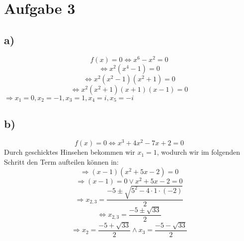 \section{Aufgabe 3}
    \subsection{a)}
        $$f(x) = 0 \Leftrightarrow x^6-x^2 = 0$$
        $$\Leftrightarrow x^2(x^4-1) = 0$$
        $$\Leftrightarrow x^2(x^2-1)(x^2+1) = 0$$
        $$\Leftrightarrow x^2(x^2+1)(x+1)(x-1) = 0$$
        $\Rightarrow x_1 = 0, x_2 = -1, x_3 = 1, x_4 = i, x_5 = -i$

    \subsection{b)}
        $$f(x) = 0 \Leftrightarrow x^3+4x^2-7x+2 = 0$$
        Durch geschicktes Hinsehen bekommen wir $x_1 = 1$, wodurch wir im folgenden Schritt den Term aufteilen können in:
        $$\Rightarrow (x-1)(x^2+5x-2) = 0$$
        $$\Rightarrow (x-1) = 0 \lor x^2+5x-2 = 0$$
        $$\Rightarrow x_{2,3} = \frac{-5 \pm \sqrt{5^2-4\cdot 1 \cdot (-2)}}{2}$$
        $$\Leftrightarrow x_{2,3} = \frac{-5 \pm \sqrt{33}}{2}$$
        $$\Rightarrow x_2 = \frac{-5 + \sqrt{33}}{2} \land x_3 = \frac{-5 - \sqrt{33}}{2}$$
        